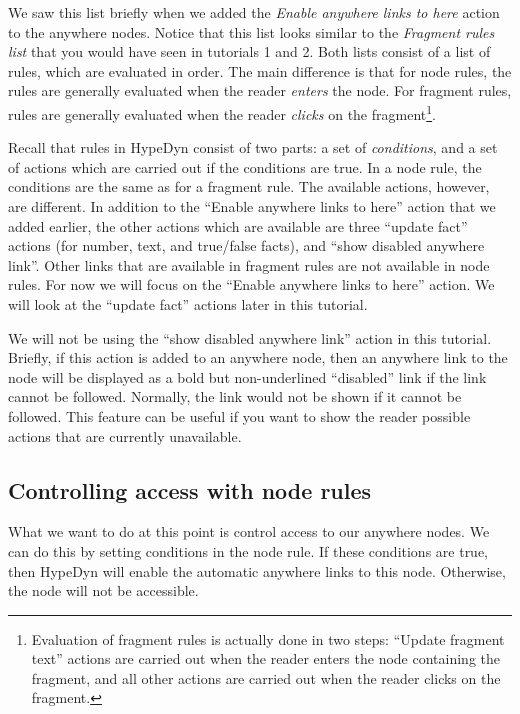 \documentclass{article}
\begin{document}
We saw this list briefly when we added the \textit{Enable anywhere links to here} action to the anywhere nodes. Notice that this list looks similar to the \textit{Fragment rules list} that you would have seen in tutorials 1 and 2. Both lists consist of a list of rules, which
are evaluated in order. The main difference is that for node rules, the rules are generally evaluated when the reader \textit{enters} the node. For fragment rules, rules are generally evaluated when the reader \textit{clicks} on the
fragment\footnote{Evaluation of fragment rules is actually done in two steps: ``Update fragment text'' actions are carried out when the reader enters the node containing the fragment, and all other actions are carried out when the reader clicks on the fragment.}.

Recall that rules in HypeDyn consist of two parts: a set of \textit{conditions}, and a set of actions which are carried out if the conditions are true. In a node rule, the conditions are the same as
for a fragment rule. The available actions, however, are different. In addition to the ``Enable anywhere links to here'' action that we added earlier, the other actions which are available are three ``update fact'' actions (for number, text, and true/false facts), and ``show disabled anywhere link''. Other links that are available in fragment rules are not available in node rules. For now we will focus on the ``Enable anywhere links to here'' action. We will look at the ``update fact'' actions later in this tutorial. 

We will not be using the ``show disabled anywhere link'' action in this tutorial. Briefly, if this action is added to an anywhere node, then an anywhere link to the node will be displayed as a bold but non-underlined ``disabled'' link if the link cannot be followed. Normally, the link would not be shown if it cannot be followed. This feature can be useful if you want to show the reader possible actions that are currently unavailable.

\subsection{Controlling access with node rules}

What we want to do at this point is control access to our anywhere nodes. We can do this by setting conditions in the node rule. If these conditions are true, then HypeDyn will enable the automatic anywhere links to this node. Otherwise, the node will not be accessible.
\end{document}

